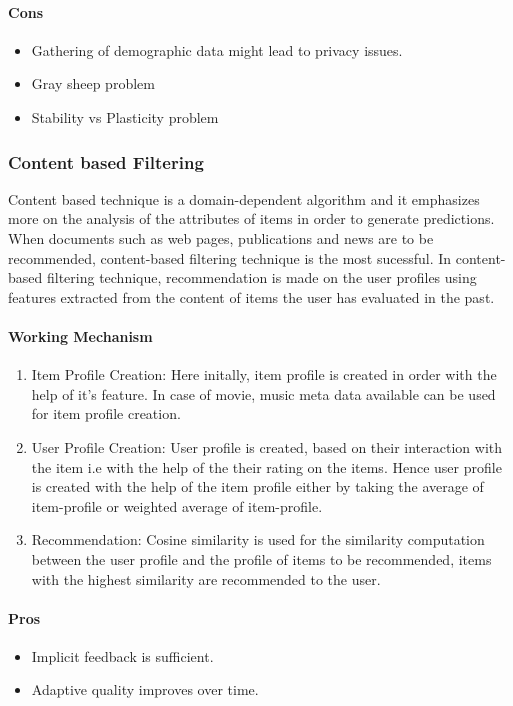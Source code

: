 \paragraph{Cons}\hfill
\begin{itemize}
	\item Gathering of demographic data might lead to privacy issues.
	\item Gray sheep problem
	\item Stability vs Plasticity problem
	
\end{itemize}
\subsubsection{Content based Filtering}
Content based technique \cite{recommend} is a domain-dependent algorithm and it emphasizes more on the analysis of the attributes of items in order to generate predictions. When documents such as web pages, publications and news are to be recommended, content-based filtering technique is the most sucessful. In content-based filtering technique, recommendation is made on the user profiles using features extracted from the content of items the user has evaluated in the past. 
\paragraph{Working Mechanism}\hfill

\begin{enumerate}
	\item Item Profile Creation: Here initally, item profile is created in order with the help of it's feature. In case of movie, music meta data available can be used for item profile creation.
	\item User Profile Creation: User profile is created, based on their interaction with the item i.e with the help of the their rating on the items. Hence user profile is created with the help of the item profile either by taking the average of item-profile or weighted average of item-profile.
	\item Recommendation: Cosine similarity is used for the similarity computation between the user profile and the profile of items to be recommended, items with the highest similarity are recommended to the user. 
\end{enumerate}

\paragraph{Pros}\hfill
\begin{itemize}
\item Implicit feedback is sufficient.
\item Adaptive quality improves over time.
\end{itemize}
